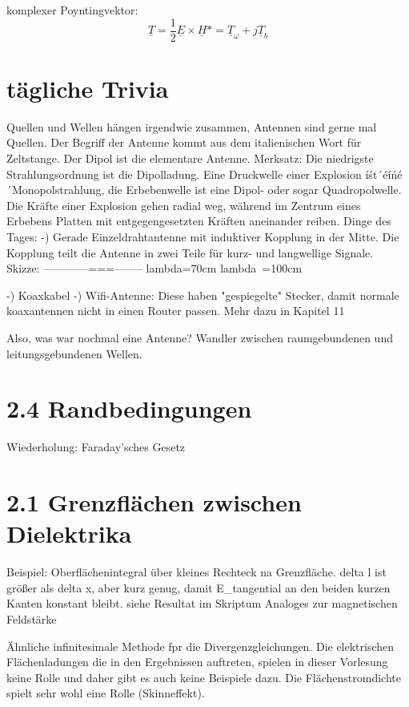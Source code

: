 \documentclass[a4paper]{article}
\begin{document}
komplexer Poyntingvektor: \[\underline{T}=\frac{1}{2}\underline{E}\times \underline{H}\ast= \underline{T}_{\omega}+j \underline{T}_{b}\]

\section{tägliche Trivia}
Quellen und Wellen hängen irgendwie zusammen, Antennen sind gerne mal Quellen.
Der Begriff der Antenne kommt aus dem italienischen Wort für Zeltstange.
Der Dipol ist die elementare Antenne.
Merksatz: Die niedrigste Strahlungsordnung ist die Dipolladung.
Eine Druckwelle einer Explosion íśt´éíńé´Monopolstrahlung, die Erbebenwelle ist
eine Dipol- oder sogar Quadropolwelle.
Die Kräfte einer Explosion gehen radial weg, während im Zentrum eines Erbebens
Platten mit entgegengesetzten Kräften aneinander reiben.
Dinge des Tages:
-) Gerade Einzeldrahtantenne mit induktiver Kopplung in der Mitte. Die Kopplung teilt die Antenne in zwei Teile für kurz- und langwellige Signale.
       Skizze: ------------===--------
                lambda=70cm   lambda~=100cm

-) Koaxkabel
-) Wifi-Antenne: Diese haben "gespiegelte" Stecker, damit normale koaxantennen 
    nicht in einen Router passen. Mehr dazu in Kapitel 11

Also, was war nochmal eine Antenne? Wandler zwischen raumgebundenen und
                                    leitungsgebundenen Wellen.

\section{2.4 Randbedingungen}
Wiederholung: Faraday'sches Gesetz

\section{2.1 Grenzflächen zwischen Dielektrika}
Beispiel: Oberflächenintegral über kleines Rechteck na Grenzfläche.
        delta l ist größer als delta x, aber kurz genug, damit E_tangential an
        den beiden kurzen Kanten konstant bleibt.
    siehe Resultat im Skriptum
Analoges zur magnetischen Feldstärke

Ähnliche infinitesimale Methode fpr die Divergenzgleichungen.
Die elektrischen Flächenladungen die in den Ergebnissen auftreten, spielen in
dieser Vorlesung keine Rolle und daher gibt es auch keine Beispiele dazu.
Die Flächenstromdichte spielt sehr wohl eine Rolle (Skinneffekt).
\end{document}
